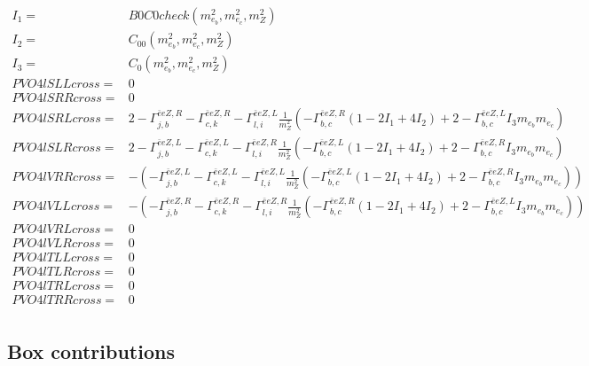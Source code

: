 \documentclass[A4,landscape]{article}
\begin{document}
\begin{align} 
I_1= & B0C0check(m^2_{e_{{b}}}, m^2_{e_{{c}}}, m^2_{Z}) \\ 
I_2= & C_{00}(m^2_{e_{{b}}}, m^2_{e_{{c}}}, m^2_{Z}) \\ 
I_3= & C_0(m^2_{e_{{b}}}, m^2_{e_{{c}}}, m^2_{Z}) \\ 
  PVO4lSLLcross= & 0 \\ 
  PVO4lSRRcross= & 0 \\ 
  PVO4lSRLcross= & 2  - \Gamma^{\bar{e}e Z ,R} _{j, b} - \Gamma^{\bar{e}e Z ,R} _{c, k} - \Gamma^{\bar{e}e Z ,L} _{l, i} \frac{1}{m^2_{Z}} (- \Gamma^{\bar{e}e Z ,R} _{b, c} (1 - 2 I_1 + 4 I_2) + 2 - \Gamma^{\bar{e}e Z ,L} _{b, c} I_3 m_{e_{{b}}} m_{e_{{c}}}) \\ 
  PVO4lSLRcross= & 2  - \Gamma^{\bar{e}e Z ,L} _{j, b} - \Gamma^{\bar{e}e Z ,L} _{c, k} - \Gamma^{\bar{e}e Z ,R} _{l, i} \frac{1}{m^2_{Z}} (- \Gamma^{\bar{e}e Z ,L} _{b, c} (1 - 2 I_1 + 4 I_2) + 2 - \Gamma^{\bar{e}e Z ,R} _{b, c} I_3 m_{e_{{b}}} m_{e_{{c}}}) \\ 
  PVO4lVRRcross= & -( - \Gamma^{\bar{e}e Z ,L} _{j, b} - \Gamma^{\bar{e}e Z ,L} _{c, k} - \Gamma^{\bar{e}e Z ,L} _{l, i} \frac{1}{m^2_{Z}} (- \Gamma^{\bar{e}e Z ,L} _{b, c} (1 - 2 I_1 + 4 I_2) + 2 - \Gamma^{\bar{e}e Z ,R} _{b, c} I_3 m_{e_{{b}}} m_{e_{{c}}})) \\ 
  PVO4lVLLcross= & -( - \Gamma^{\bar{e}e Z ,R} _{j, b} - \Gamma^{\bar{e}e Z ,R} _{c, k} - \Gamma^{\bar{e}e Z ,R} _{l, i} \frac{1}{m^2_{Z}} (- \Gamma^{\bar{e}e Z ,R} _{b, c} (1 - 2 I_1 + 4 I_2) + 2 - \Gamma^{\bar{e}e Z ,L} _{b, c} I_3 m_{e_{{b}}} m_{e_{{c}}})) \\ 
  PVO4lVRLcross= & 0 \\ 
  PVO4lVLRcross= & 0 \\ 
  PVO4lTLLcross= & 0 \\ 
  PVO4lTLRcross= & 0 \\ 
  PVO4lTRLcross= & 0 \\ 
  PVO4lTRRcross= & 0 \\ 
\end{align} 
\subsection{Box contributions} 
\end{document}
